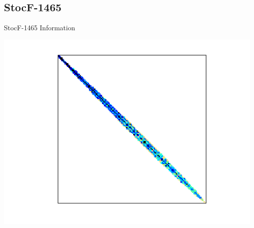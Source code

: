 
\subsection{StocF-1465}
\begin{table}[ht!]
	\begin{minipage}{0.5\linewidth}
		\caption{StocF-1465 Information}
		\label{table:StocF-1465}
		\centering
        
	\end{minipage}\hfill
	\begin{minipage}{0.45\linewidth}
		\centering
		\includegraphics[width=1\textwidth]{figs/StocF-1465.png}
		\label{fig:StocF-1465}
	\end{minipage}
\end{table}



